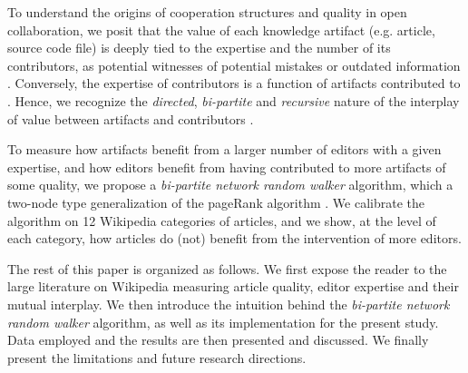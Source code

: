 To understand the origins of cooperation structures and quality in open collaboration, we posit that the value of each knowledge artifact (e.g. article, source code file) is deeply tied to the expertise and the number of its contributors, as potential witnesses of potential mistakes or outdated information \cite{}. Conversely, the expertise of contributors is a function of artifacts contributed to \cite{}.  Hence, we recognize the {\it directed}, {\it bi-partite} and {\it recursive} nature of the interplay of value between artifacts and contributors \cite{kane2009}.

To measure how artifacts benefit from a larger number of editors with a given expertise, and how editors benefit from having contributed to more artifacts of some quality, we propose a {\it bi-partite network random walker} algorithm, which a two-node type generalization of the pageRank algorithm \cite{page1999pagerank}. We calibrate the algorithm on 12 Wikipedia categories of articles, and we show, at the level of each category, how articles do (not) benefit from the intervention of more editors. 

The rest of this paper is organized as follows. We first expose the reader to the large literature on Wikipedia measuring article quality, editor expertise and their mutual interplay. We then introduce the intuition behind the {\it bi-partite network random walker} algorithm, as well as its implementation for the present study. Data employed and the results are then presented and discussed. We finally present the limitations and future research directions.
